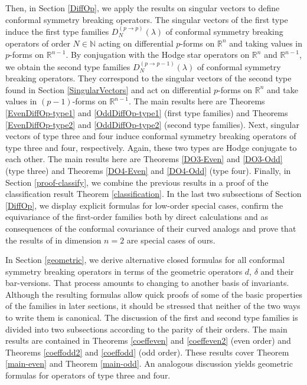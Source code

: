 \documentclass[a4paper,12pt,reqno]{amsart}
\numberwithin{theorem}{subsection}
\numberwithin{equation}{section}
\begin{document}
Then, in Section \ref{DiffOp}, we apply the results on singular vectors to
define conformal symmetry breaking operators. The singular vectors of the first
type induce the first type families $D_N^{(p \to p)}(\lambda)$ of conformal
symmetry breaking operators of order $N \in {\mathbb{N}}$ acting on differential
$p$-forms on ${\mathbb{R}}^n$ and taking values in $p$-forms on ${\mathbb{R}}^{n-1}$. By
conjugation with the Hodge star operators on ${\mathbb{R}}^n$ and ${\mathbb{R}}^{n-1}$, we obtain
the second type families $D_N^{(p \to p-1)}(\lambda)$ of conformal symmetry
breaking operators. They correspond to the singular vectors of the second type
found in Section \ref{SingularVectors} and act on differential $p$-forms on
${\mathbb{R}}^n$ and take values in $(p\!-\!1)$-forms on ${\mathbb{R}}^{n-1}$. The main results
here are Theorems \ref{EvenDiffOp-type1} and \ref{OddDiffOp-type1} (first type
families) and Theorems \ref{EvenDiffOp-type2} and \ref{OddDiffOp-type2} (second
type families). Next, singular vectors of type three and four induce conformal
symmetry breaking operators of type three and four, respectively. Again, these
two types are Hodge conjugate to each other. The main results here are Theorems
\ref{DO3-Even} and \ref{DO3-Odd} (type three) and Theorems \ref{DO4-Even} and
\ref{DO4-Odd} (type four). Finally, in Section \ref{proof-classify}, we combine
the previous results in a proof of the classification result Theorem
\ref{classification}. In the last two subsections of Section \ref{DiffOp}, we
display explicit formulas for low-order special cases, confirm the equivariance
of the first-order families both by direct calculations and as consequences of
the conformal covariance of their curved analogs and prove that the results of
\cite{KKP} in dimension $n=2$ are special cases of ours.

In Section \ref{geometric}, we derive alternative closed formulas for all
conformal symmetry breaking operators in terms of the geometric operators $d$,
$\delta$ and their bar-versions. That process amounts to changing to another
basis of invariants. Although the resulting formulas allow quick proofs of some
of the basic properties of the families in later sections, it should be
stressed that neither of the two ways to write them is canonical. The
discussion of the first and second type families is divided into two
subsections according to the parity of their orders. The main results are
contained in Theorems \ref{coeffeven} and \ref{coeffeven2} (even order) and
Theorems \ref{coeffodd2} and \ref{coeffodd} (odd order). These results cover
Theorem \ref{main-even} and Theorem \ref{main-odd}. An analogous discussion
yields geometric formulas for operators of type three and four.
\end{document}

